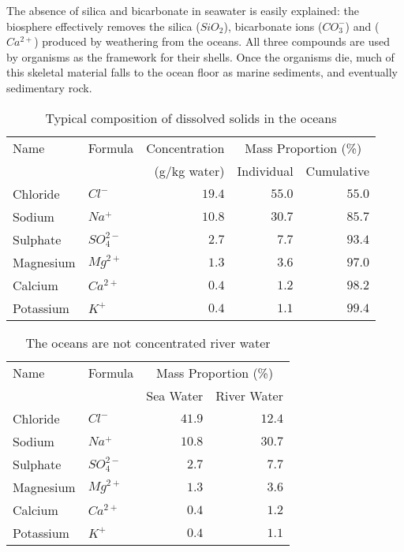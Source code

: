 The absence of silica and bicarbonate in seawater is easily explained: the biosphere effectively removes the silica ($SiO_2$), bicarbonate ions ($CO_3^-$) and ($Ca^{2+}$) produced by weathering from the oceans. All three compounds are used by organisms as the framework for their shells. Once the organisms die, much of this skeletal material falls to the ocean floor as marine sediments, and eventually sedimentary rock.\\
\begin{table} 
\centering
\caption{Typical composition of dissolved solids in the oceans}
\label{tab:salinity}
\begin{tabular}{@{}llrrr@{}} \toprule
Name      & Formula			&Concentration  & \multicolumn{2}{c}{Mass Proportion (\%)}\\ \cmidrule(r){4-5}
					&	             & (g/kg water)& Individual            &Cumulative 		\\  \midrule
Chloride	&$Cl^-$        &$ 19.4$	&$ 55.0$	&$55.0$\\
Sodium    &$Na^+$        &$ 10.8$	&$ 30.7$	&$85.7$\\
Sulphate  &$SO_{4}^{2-}$ &$  2.7$ &$  7.7$	&$93.4$\\
Magnesium	&$Mg^{2+}    $ &$  1.3$ &$  3.6$  &$97.0$\\
Calcium   &$Ca^{2+}$     &$  0.4$ &$  1.2$  &$98.2$\\
Potassium &$K^+$         &$  0.4$ &$  1.1$  &$99.4$\\ \bottomrule
\end{tabular}

\end{table}

\begin{table} 
\centering
\caption{The oceans are not concentrated river water}
\label{tab:river_ocean_comp}
\begin{tabular}{@{}llrr@{}} \toprule
Name      & Formula			 & \multicolumn{2}{c}{Mass Proportion (\%)}\\ \cmidrule(r){3-4}
					&	             & Sea Water  & River Water \\  \midrule
Chloride	&$Cl^-$        &$ 41.9$	&$ 12.4$\\
Sodium    &$Na^+$        &$ 10.8$	&$ 30.7$\\
Sulphate  &$SO_{4}^{2-}$ &$  2.7$ &$  7.7$\\
Magnesium	&$Mg^{2+}    $ &$  1.3$ &$  3.6$\\
Calcium   &$Ca^{2+}$     &$  0.4$ &$  1.2$\\
Potassium &$K^+$         &$  0.4$ &$  1.1$\\ \bottomrule
\end{tabular}
\end{table}

